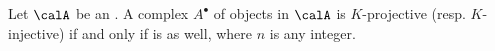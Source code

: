 \begin{proposition}  \label{proposition:complex_in_abelian_category_is_K_projective_K_injective_iff_shifts_are}
Let $\calA$ be an . 
A complex $A^\bullet$ of objects in $\calA$ is $K$-projective (resp. $K$-injective) if and only if  is as well, where $n$ is any integer.
\end{proposition}